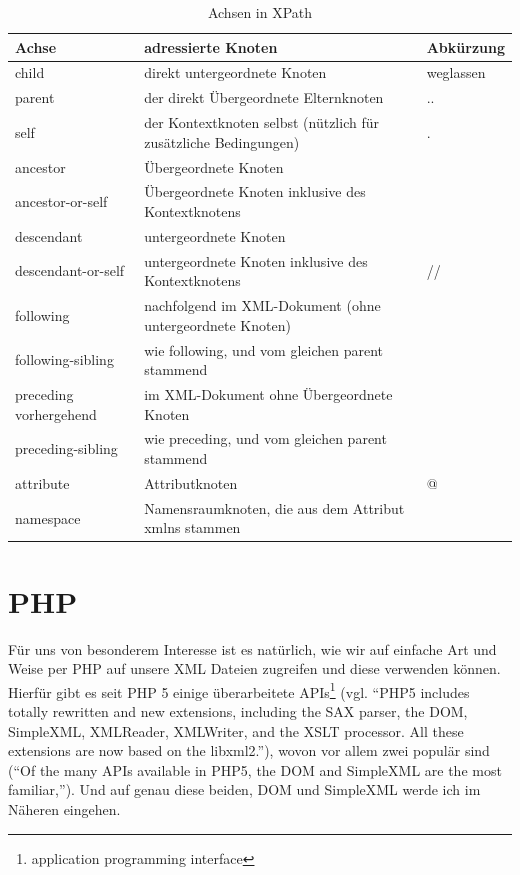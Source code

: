 {\small
  \begin{table}[hb]
    \caption{Achsen in XPath\cite{wiki:de:xpath}}
    \begin{tabularx}{\textwidth}{l|X|l}
      Achse & adressierte Knoten & Abkürzung \\
      \hline
      child & direkt untergeordnete Knoten & weglassen \\
      parent & der direkt Übergeordnete Elternknoten  & .. \\
      self & der Kontextknoten selbst (nützlich für zusätzliche Bedingungen) & . \\
      ancestor & Übergeordnete Knoten & \\
      ancestor-or-self & Übergeordnete Knoten inklusive des Kontextknotens & \\
      descendant & untergeordnete Knoten & \\
      descendant-or-self & untergeordnete Knoten inklusive des Kontextknotens & // \\
      following & nachfolgend im XML-Dokument (ohne untergeordnete Knoten) & \\
      following-sibling & wie following, und vom gleichen parent stammend & \\
      preceding vorhergehend & im XML-Dokument ohne Übergeordnete Knoten & \\
      preceding-sibling & wie preceding, und vom gleichen parent stammend & \\
      attribute & Attributknoten & @ \\
      namespace & Namensraumknoten, die aus dem Attribut xmlns stammen &
    \end{tabularx}
  \end{table}
}

\section{PHP}
Für uns von besonderem Interesse ist es natürlich, wie wir auf
einfache Art und Weise per PHP auf unsere XML Dateien zugreifen und
diese verwenden können. Hierfür gibt es seit PHP 5 einige
überarbeitete APIs\footnote{application programming interface} (vgl.
\enquote{PHP5 includes totally rewritten and new extensions, including
  the SAX parser, the DOM, SimpleXML, XMLReader, XMLWriter, and the
  XSLT processor. All these extensions are now based on the
  libxml2.}\cite{www:ibm:xml}), wovon vor allem zwei populär sind
(\enquote{Of the many APIs available in PHP5, the DOM and SimpleXML
  are the most familiar,}\cite{www:ibm:xml}). Und auf genau diese
beiden, DOM und SimpleXML werde ich im Näheren eingehen.
